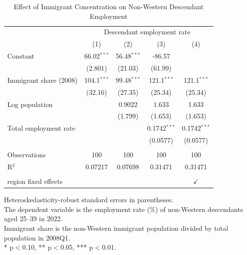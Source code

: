 \begin{table}[htbp]
   \caption{\label{tab:employment} Effect of Immigrant Concentration on Non-Western Descendant Employment}
   \bigskip
   \centering
   \begin{tabular}{lcccc}
      \toprule
       & \multicolumn{4}{c}{Descendant employment rate}\\
                             & (1)           & (2)           & (3)            & (4)\\  
      \midrule 
      Constant               & 66.02$^{***}$ & 56.48$^{***}$ & -86.57         &   \\   
                             & (2.801)       & (21.03)       & (61.99)        &   \\   
      Immigrant share (2008) & 104.1$^{***}$ & 99.48$^{***}$ & 121.1$^{***}$  & 121.1$^{***}$\\   
                             & (32.16)       & (27.35)       & (25.34)        & (25.34)\\   
      Log population         &               & 0.9022        & 1.633          & 1.633\\   
                             &               & (1.799)       & (1.653)        & (1.653)\\   
      Total employment rate  &               &               & 0.1742$^{***}$ & 0.1742$^{***}$\\   
                             &               &               & (0.0577)       & (0.0577)\\   
       \\
      Observations           & 100           & 100           & 100            & 100\\  
      R$^2$                  & 0.07217       & 0.07698       & 0.31471        & 0.31471\\  
       \\
      region fixed effects   &               &               &                & $\checkmark$\\   
      \bottomrule
   \end{tabular}
   
   \par \raggedright 
   Heteroskedasticity-robust standard errors in parentheses.\\
   The dependent variable is the employment rate (\%) of non-Western descendants aged 25--39 in 2022.\\
   Immigrant share is the non-Western immigrant population divided by total population in 2008Q1.\\
   * p$<$0.10, ** p$<$0.05, *** p$<$0.01.
\end{table}
